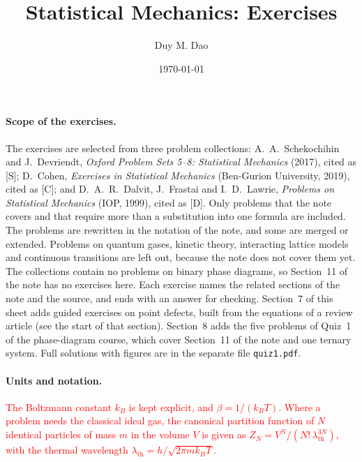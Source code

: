 \documentclass[11pt]{article}      %
\title{Statistical Mechanics: Exercises}
\author{Duy M. Dao}
\date{\today}                      %
\numberwithin{equation}{section}   %
\begin{document}
\maketitle                         %

\newenvironment{parts}
  {\begin{enumerate}\renewcommand{\theenumi}{\alph{enumi}}\renewcommand{\labelenumi}{(\theenumi)}}
  {\end{enumerate}}

\paragraph{Scope of the exercises.}
The exercises are selected from three problem collections:
A.~A.~Schekochihin and J.~Devriendt, \textit{Oxford Problem Sets 5--8: Statistical Mechanics} (2017), cited as [S];
D.~Cohen, \textit{Exercises in Statistical Mechanics} (Ben-Gurion University, 2019), cited as [C];
and D.~A.~R.~Dalvit, J.~Frastai and I.~D.~Lawrie, \textit{Problems on Statistical Mechanics} (IOP, 1999), cited as [D].
Only problems that the note covers and that require more than a substitution into one formula are included.
The problems are rewritten in the notation of the note, and some are merged or extended.
Problems on quantum gases, kinetic theory, interacting lattice models and continuous transitions are left out, because the note does not cover them yet.
The collections contain no problems on binary phase diagrams, so Section~11 of the note has no exercises here.
Each exercise names the related sections of the note and the source, and ends with an answer for checking.
Section~7 of this sheet adds guided exercises on point defects, built from the equations of a review article (see the start of that section).
Section~8 adds the five problems of Quiz~1 of the phase-diagram course, which cover Section~11 of the note and one ternary system. Full solutions with figures are in the separate file \texttt{quiz1.pdf}.

\paragraph{Units and notation.}
\textcolor{red}{The Boltzmann constant $k_B$ is kept explicit, and $\beta = 1/(k_BT)$.
Where a problem needs the classical ideal gas, the canonical partition function of $N$ identical particles of mass $m$ in the volume $V$ is given as $Z_N = V^N/(N!\,\lambda_{\text{th}}^{3N})$, with the thermal wavelength $\lambda_{\text{th}} = h/\sqrt{2\pi m k_BT}$.}
\end{document}
